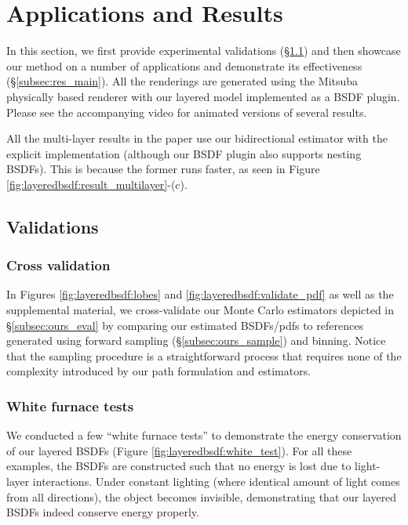 \section{Applications and Results}
\label{sec:results}

In this section, we first provide experimental validations (\S\ref{subsec:res_validation}) and then showcase our method on a number of applications and demonstrate its effectiveness (\S\ref{subsec:res_main}).
All the renderings are generated using the Mitsuba physically based renderer \cite{jakob2010mitsuba} with our layered model implemented as a BSDF plugin.
Please see the accompanying video for animated versions of several results.

All the multi-layer results in the paper use our bidirectional estimator with the explicit implementation (although our BSDF plugin also supports nesting BSDFs).
This is because the former runs faster, as seen in Figure \ref{fig:layeredbsdf:result_multilayer}-(c).

\subsection{Validations}
\label{subsec:res_validation}

\subsubsection{Cross validation}
In Figures \ref{fig:layeredbsdf:lobes} and \ref{fig:layeredbsdf:validate_pdf} as well as the supplemental material, we cross-validate our Monte Carlo estimators depicted in \S\ref{subsec:ours_eval} by comparing our estimated BSDFs/pdfs to references generated using forward sampling (\S\ref{subsec:ours_sample}) and binning. Notice that the sampling procedure is a straightforward process that requires none of the complexity introduced by our path formulation and estimators.

\subsubsection{White furnace tests}
We conducted a few ``white furnace tests'' to demonstrate the energy conservation of our layered BSDFs (Figure \ref{fig:layeredbsdf:white_test}).
For all these examples, the BSDFs are constructed such that no energy is lost due to light-layer interactions.
Under constant lighting (where identical amount of light comes from all directions), the object becomes invisible, demonstrating that our layered BSDFs indeed conserve energy properly.

